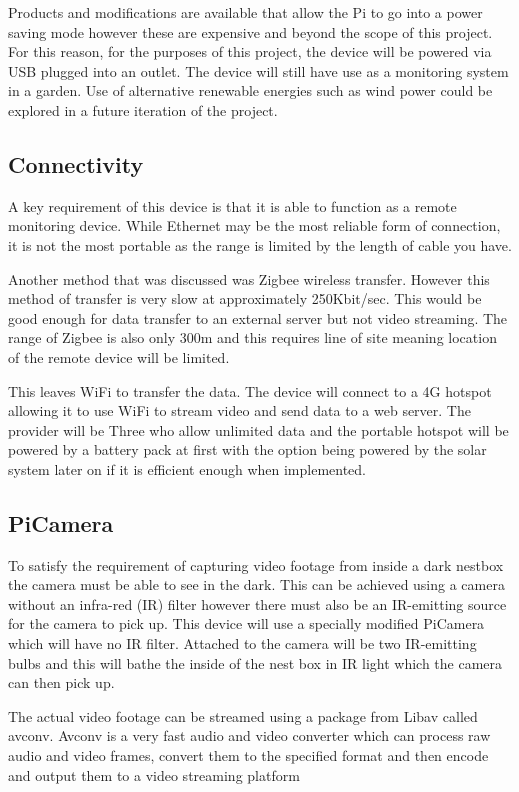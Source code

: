 \documentclass[10pt,a4paper]{article}
\begin{document}
Products and modifications are available that allow the Pi to go into a power saving mode however these are expensive and beyond the scope of this project. For this reason, for the purposes of this project, the device will be powered via USB plugged into an outlet. The device will still have use as a monitoring system in a garden. Use of alternative renewable energies such as wind power could be explored in a future iteration of the project.


\subsection{Connectivity}
A key requirement of this device is that it is able to function as a remote monitoring device. While Ethernet may be the most reliable form of connection, it is not the most portable as the range is limited by the length of cable you have. 

Another method that was discussed was Zigbee wireless transfer. However this method of transfer is very slow at approximately 250Kbit/sec. This would be good enough for data transfer to an external server but not video streaming. The range of Zigbee is also only 300m and this requires line of site meaning location of the remote device will be limited. 

This leaves WiFi to transfer the data. The device will connect to a 4G hotspot allowing it to use WiFi to stream video and send data to a web server. The provider will be Three who allow unlimited data and the portable hotspot will be powered by a battery pack at first with the option being powered by the solar system later on if it is efficient enough when implemented. 

\subsection{PiCamera}
To satisfy the requirement of capturing video footage from inside a dark nestbox the camera must be able to see in the dark. This can be achieved using a camera without an infra-red (IR) filter however there must also be an IR-emitting source for the camera to pick up. This device will use a specially modified PiCamera which will have no IR filter. Attached to the camera will be two IR-emitting bulbs and this will bathe the inside of the nest box in IR light which the camera can then pick up. 

The actual video footage can be streamed using a package from Libav called avconv. Avconv is a very fast audio and video converter which can process raw audio and video frames, convert them to the specified format and then encode and output them to a video streaming platform\cite{avconv}
\end{document}
